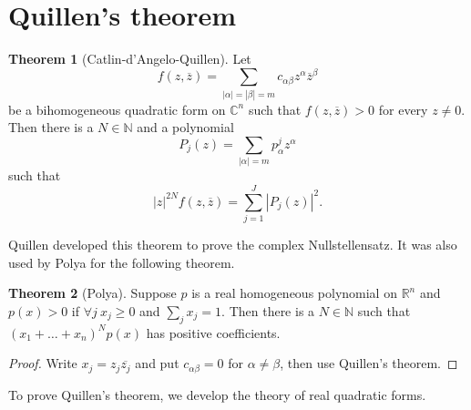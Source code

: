 \documentclass[12pt]{report}
\newcommand{\NN}{\mathbb{N}}
\newcommand{\RR}{\mathbb{R}}
\newcommand{\CC}{\mathbb{C}}
\theoremstyle{definition}
\newtheorem{theorem}{Theorem}[chapter]
\begin{document}
\section{Quillen's theorem}
\begin{theorem}[Catlin-d'Angelo-Quillen]
    Let
    $$f(z, \overline z) = \sum_{|\alpha| = |\beta| = m} c_{\alpha\beta} z^\alpha \overline z^\beta$$
    be a bihomogeneous quadratic form on $\CC^n$ such that $f(z, \overline z) > 0$ for every $z \neq 0$. Then there is a $N \in \NN$ and a polynomial
    $$P_j(z) = \sum_{|\alpha| = m} p_\alpha^j z^\alpha$$
    such that 
    $$|z|^{2N} f(z, \overline z) = \sum_{j=1}^J |P_j(z)|^2.$$
\end{theorem}
    Quillen developed this theorem to prove the complex Nullstellensatz. It was also used by Polya for the following theorem.
\begin{theorem}[Polya]
    Suppose $p$ is a real homogeneous polynomial on $\RR^n$ and $p(x) > 0$ if $\forall j ~x_j \geq 0$ and $\sum_j x_j = 1$. Then there is a $N \in \NN$ such that $(x_1 + \dots + x_n)^Np(x)$ has positive coefficients.
\end{theorem}
\begin{proof}
    Write $x_j = z_j \overline{z_j}$ and put $c_{\alpha\beta} = 0$ for $\alpha \neq \beta$, then use Quillen's theorem.
\end{proof}
    To prove Quillen's theorem, we develop the theory of real quadratic forms.
\end{document}
